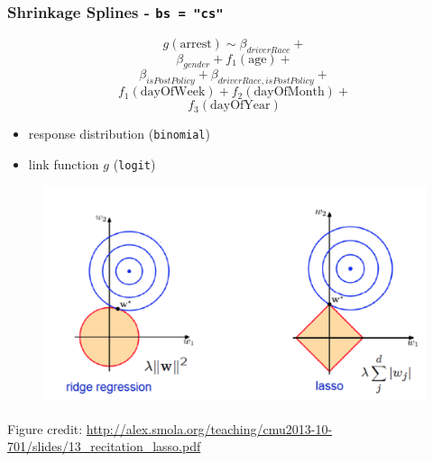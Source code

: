 \documentclass{beamer}
\begin{document}
\begin{frame}
\frametitle{Shrinkage Splines - \texttt{bs = "cs"}}


\begin{multicols}{2}
$$g(\text{arrest}) \sim \beta_{driverRace} + $$
$$ \beta_{gender} + f_1(\text{age}) +$$
$$\beta_{isPostPolicy}+ \beta_{driverRace, isPostPolicy}+$$
$$ f_1(\text{dayOfWeek}) + f_2(\text{dayOfMonth})+ $$
$$ f_3(\text{dayOfYear})$$


\begin{itemize}
\item response distribution (\texttt{binomial}) 
\item link function $g$ (\texttt{logit})
\end{itemize}

\columnbreak

\begin{figure}
\includegraphics[scale=.2]{figures/regularizationEx}
\end{figure}

\footnotesize{Figure credit: \url{http://alex.smola.org/teaching/cmu2013-10-701/slides/13_recitation_lasso.pdf}}

\end{multicols}

\end{frame}
\end{document}
